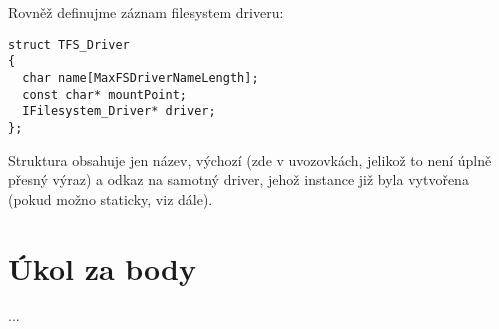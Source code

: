 \documentclass{article}
\begin{document}
Rovněž definujme záznam filesystem driveru:
\begin{lstlisting}
struct TFS_Driver
{
  char name[MaxFSDriverNameLength];
  const char* mountPoint;
  IFilesystem_Driver* driver;
};
\end{lstlisting}
Struktura obsahuje jen název, výchozí  (zde v uvozovkách, jelikož to není úplně přesný výraz) a odkaz na samotný driver, jehož instance již byla vytvořena (pokud možno staticky, viz dále).











\section{Úkol za body}

...
\end{document}
